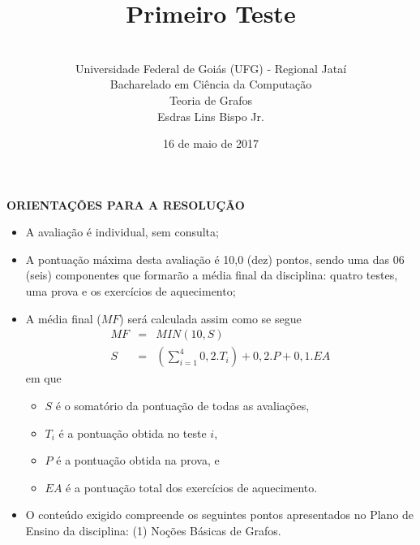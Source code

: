 \documentclass[12pt,a4paper,oneside]{article}
\author{\\Universidade Federal de Goiás (UFG) - Regional Jataí\\Bacharelado em Ciência da Computação \\Teoria de Grafos \\Esdras Lins Bispo Jr.}
\title{\sc \huge Primeiro Teste}
\date{16 de maio de 2017}
\begin{document}
\maketitle

{\bf ORIENTAÇÕES PARA A RESOLUÇÃO}

\footnotesize

\begin{itemize}
	\item A avaliação é individual, sem consulta;
	\item A pontuação máxima desta avaliação é 10,0 (dez) pontos, sendo uma das 06 (seis) componentes que formarão a média final da disciplina: quatro testes, uma prova e os exercícios de aquecimento;
	\item A média final ($MF$) será calculada assim como se segue
	\begin{eqnarray}
		MF & = & MIN(10, S) \nonumber \\
		S & = & (\sum_{i=1}^{4} 0,2.T_i ) + 0,2.P  + 0,1.EA \nonumber
	\end{eqnarray}
	em que 
	\begin{itemize}
		\item $S$ é o somatório da pontuação de todas as avaliações,
		\item $T_i$ é a pontuação obtida no teste $i$,
		\item $P$ é a pontuação obtida na prova, e
		\item $EA$ é a pontuação total dos exercícios de aquecimento.
	\end{itemize}
	\item O conteúdo exigido compreende os seguintes pontos apresentados no Plano de Ensino da disciplina: (1) Noções Básicas de Grafos.
\end{itemize}


\begin{center}
\end{center}

\newpage

\normalsize
\end{document}
